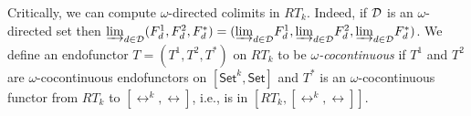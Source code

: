 \documentclass[runningheads]{llncs}
\newcommand{\set}{\mathsf{Set}}
\begin{document}
Critically, we can compute $\omega$-directed colimits in
$RT_k$. Indeed, if $\cal D$ is an $\omega$-directed set then ${{\underrightarrow{\lim}}_{d
  \in {\cal D}}{(F^1_d, F^2_d,F^*_d)}} = ({{\underrightarrow{\lim}}_{d \in {\cal
    D}}{F^1_d}}, {{\underrightarrow{\lim}}_{d \in {\cal D}}{F^2_d}}, {{\underrightarrow{\lim}}_{d \in {\cal
    D}}{F^*_d}})$.  We define an endofunctor $T = (T^1,T^2,T^*)$ on
$RT_k$ to be {\em $\omega$-cocontinuous} if $T^1$ and $T^2$ are
$\omega$-cocontinuous endofunctors on $[\set^k,\set]$ and $T^*$ is an
$\omega$-cocontinuous functor from $RT_k$ to $[\rel^k,\rel]$, i.e., is
in $[RT_k,[\rel^k,\rel]]$.
%
\end{document}
